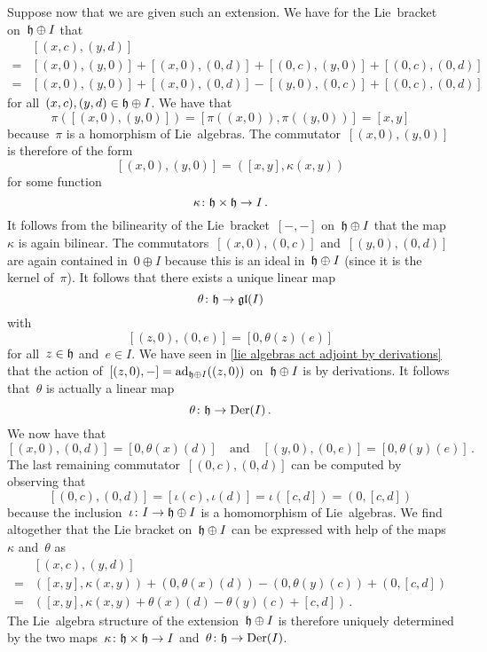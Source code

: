 \begin{remark}
  Suppose now that we are given such an extension.
  We have for the Lie~bracket on~$\mathfrak{h} \oplus I$ that
  \begin{align*}
    {}&
    [(x, c), (y,d)]
    \\
    ={}&
      [(x,0), (y,0)]
    + [(x,0), (0,d)]
    + [(0,c), (y,0)]
    + [(0,c), (0,d)]
    \\
    ={}&
      [(x,0), (y,0)]
    + [(x,0), (0,d)]
    - [(y,0), (0,c)]
    + [(0,c), (0,d)]
  \end{align*}
  for all~$(x,c), (y,d) \in \mathfrak{h} \oplus I$.
  We have that
  \[
    \pi( [(x,0), (y,0)] )
    =
    [ \pi( (x,0) ), \pi( (y,0) ) ]
    =
    [x, y]
  \]
  because~$\pi$ is a homorphism of Lie~algebras.
  The commutator~$[(x,0), (y,0)]$ is therefore of the form
  \[
    [(x,0), (y,0)]
    =
    ( [x,y], \kappa(x,y) )
  \]
  for some function
  \[
    \kappa
    \colon
    \mathfrak{h} \times \mathfrak{h}
    \to
    I \,.
  \]
  It follows from the bilinearity of the Lie~bracket~$[-,-]$ on~$\mathfrak{h} \oplus I$ that the map~$\kappa$ is again bilinear.
  The commutators~$[(x,0), (0,c)]$ and~$[(y,0), (0,d)]$ are again contained in~$0 \oplus I$ because this is an ideal in~$\mathfrak{h} \oplus I$ (since it is the kernel of~$\pi$).
  It follows that there exists a unique linear map
  \[
    \theta
    \colon
    \mathfrak{h}
    \to
    \mathfrak{gl}(I)
  \]
  with
  \[
    [(z,0), (0,e)]
    =
    [0, \theta(z)(e)]
  \]
  for all~$z \in \mathfrak{h}$ and~$e \in I$.
  We have seen in \cref{lie algebras act adjoint by derivations} that the action of~$[(z,0), -] = \operatorname{ad}_{\mathfrak{h} \oplus I}((z,0))$ on~$\mathfrak{h} \oplus I$ is by derivations.
  It follows that~$\theta$ is actually a linear map
  \[
    \theta
    \colon
    \mathfrak{h}
    \to
    \operatorname{Der}(I) \,.
  \]
  We now have that
  \[
    [(x,0), (0,d)]
    =
    [0, \theta(x)(d)]
    \quad\text{and}\quad
    [(y,0), (0,e)]
    =
    [0, \theta(y)(e)] \,.
  \]
  The last remaining commutator~$[(0,c), (0,d)]$ can be computed by observing that
  \[
    [(0,c), (0,d)]
    =
    [\iota(c), \iota(d)]
    =
    \iota([c,d])
    =
    (0, [c,d])
  \]
  because the inclusion~$\iota \colon I \to \mathfrak{h} \oplus I$ is a homomorphism of Lie~algebras.
  We find altogether that the Lie bracket on~$\mathfrak{h} \oplus I$ can be expressed with help of the maps~$\kappa$ and~$\theta$ as
  \begin{align*}
    {}&
    [ (x,c), (y,d) ]
    \\
    ={}&
      ( [x,y], \kappa(x,y) )
    + ( 0, \theta(x)(d) )
    - ( 0, \theta(y)(c) )
    + ( 0, [c,d] )
    \\
    ={}&
    ( [x,y], \kappa(x,y) + \theta(x)(d) - \theta(y)(c) + [c,d] ) \,.
  \end{align*}
  The Lie~algebra structure of the extension~$\mathfrak{h} \oplus I$ is therefore uniquely determined by the two maps~$\kappa \colon \mathfrak{h} \times \mathfrak{h} \to I$ and~$\theta \colon \mathfrak{h} \to \operatorname{Der}(I)$.


\end{remark}

